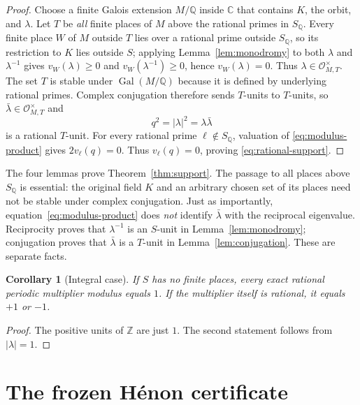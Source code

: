 \documentclass[11pt]{article}
\newtheorem{corollary}[theorem]{Corollary}
\theoremstyle{definition}
\theoremstyle{remark}
\newcommand{\C}{\mathbb C}
\newcommand{\Q}{\mathbb Q}
\newcommand{\Z}{\mathbb Z}
\newcommand{\SQ}{S_{\Q}}
\begin{document}
\begin{proof}
Choose a finite Galois extension $M/\Q$ inside $\C$ that contains $K$, the
orbit, and $\lambda$.  Let $T$ be \emph{all} finite places of $M$ above the
rational primes in $\SQ$.  Every finite place $W$ of $M$ outside $T$ lies over
a rational prime outside $\SQ$, so its restriction to $K$ lies outside $S$;
applying Lemma~\ref{lem:monodromy} to both $\lambda$ and $\lambda^{-1}$ gives
$v_W(\lambda)\geq0$ and $v_W(\lambda^{-1})\geq0$, hence
$v_W(\lambda)=0$.  Thus $\lambda\in\mathcal O_{M,T}^{\times}$.  The set $T$
is stable under
$\operatorname{Gal}(M/\Q)$ because it is defined by underlying rational
primes.  Complex conjugation therefore sends $T$-units to $T$-units, so
$\bar\lambda\in\mathcal O_{M,T}^{\times}$ and
\begin{equation}
 q^2=|\lambda|^2=\lambda\bar\lambda
 \label{eq:modulus-product}
\end{equation}
is a rational $T$-unit.  For every rational prime
$\ell\notin\SQ$, valuation of \eqref{eq:modulus-product} gives
$2v_\ell(q)=0$.  Thus $v_\ell(q)=0$, proving
\eqref{eq:rational-support}.
\end{proof}

The four lemmas prove Theorem~\ref{thm:support}.  The passage to all places
above $\SQ$ is essential: the original field $K$ and an arbitrary chosen set
of its places need not be stable under complex conjugation.  Just as
importantly, equation~\eqref{eq:modulus-product} does \emph{not} identify
$\bar\lambda$ with the reciprocal eigenvalue.  Reciprocity proves that
$\lambda^{-1}$ is an $S$-unit in Lemma~\ref{lem:monodromy}; conjugation proves
that $\bar\lambda$ is a $T$-unit in Lemma~\ref{lem:conjugation}.  These are
separate facts.

\begin{corollary}[Integral case]
\label{cor:integral}
If $S$ has no finite places, every exact rational periodic multiplier modulus
equals $1$.  If the multiplier itself is rational, it equals $+1$ or $-1$.
\end{corollary}

\begin{proof}
The positive units of $\Z$ are just $1$.  The second statement follows from
$|\lambda|=1$.
\end{proof}

\section{The frozen H\'enon certificate}
\label{sec:frozen}
\end{document}
